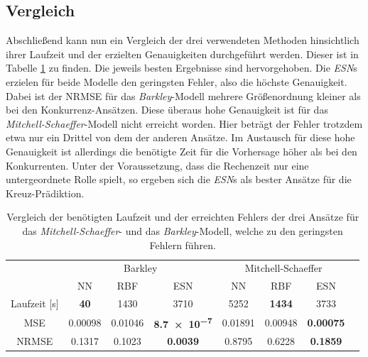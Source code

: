\subsection{Vergleich}
Abschließend kann nun ein Vergleich der drei verwendeten Methoden hinsichtlich ihrer Laufzeit und der erzielten Genauigkeiten durchgeführt werden. Dieser ist in Tabelle \ref{tab:exp_cross_comparison_results} zu finden. Die jeweils  besten Ergebnisse sind hervorgehoben. Die \textit{ESN}s erzielen für beide Modelle den geringsten Fehler, also die höchste Genauigkeit. Dabei ist der NRMSE für das \textit{Barkley}-Modell mehrere Größenordnung kleiner als bei den Konkurrenz-Ansätzen. Diese überaus hohe Genauigkeit ist für das \textit{Mitchell-Schaeffer}-Modell nicht erreicht worden. Hier beträgt der Fehler trotzdem etwa nur ein Drittel von dem der anderen Ansätze. Im Austausch für diese hohe Genauigkeit ist allerdings die benötigte Zeit für die Vorhersage höher als bei den Konkurrenten. Unter der Voraussetzung, dass die Rechenzeit nur eine untergeordnete Rolle spielt, so ergeben sich die \textit{ESN}s als bester Ansätze für die Kreuz-Prädiktion.
\begin{table}[h]
	\centering
	\captionsetup{width=0.9\linewidth}
	\begin{tabular}{cccccccc}
		\hline		
		\multicolumn{1}{c}{} & \multicolumn{3}{c}{Barkley} & \multicolumn{3}{c}{Mitchell-Schaeffer}		\\
		\multicolumn{1}{c}{} & NN & RBF & ESN & NN & RBF & ESN \\
		
		\hline
		
		Laufzeit [s] 	& \textbf{40} 		& 1430		& 3710		& 5252		& \textbf{1434} 		& 3733 \\
		MSE 			& 0.00098	& 0.01046	& \textbf{\num{8.7e-7}} 	& 0.01891	& 0.00948 	& \textbf{0.00075} \\
		NRMSE 			& 0.1317	& 0.1023	& \textbf{\num{0.0039}} 	& 0.8795	& 0.6228 	& \textbf{0.1859} \\
		\hline 
	\end{tabular} 
	\caption{Vergleich der benötigten Laufzeit und der erreichten Fehlers der drei Ansätze für das \textit{Mitchell-Schaeffer}- und das \textit{Barkley}-Modell, welche zu den geringsten Fehlern führen.}
	\label{tab:exp_cross_comparison_results}
\end{table}

\FloatBarrier